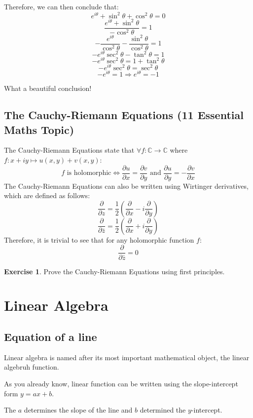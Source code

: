 \documentclass[a4paper]{article}
\theoremstyle{definition}
\newtheorem{exercise}{Exercise}[section]
\newcommand{\sectionSpace}{\vspace{2em}} %
\begin{document}
    Therefore, we can then conclude that:
    $$e^{i\theta} + \sin^2\theta + \cos^2\theta = 0$$
    $$\frac{e^{i\theta} + \sin^2\theta}{-\cos^2\theta} = 1$$
    $$-\frac{e^{i\theta}}{\cos^2\theta} -\frac{\sin^2\theta}{\cos^2\theta} = 1$$
    $$-e^{i\theta}\sec^2\theta -\tan^2\theta = 1$$
    $$-e^{i\theta}\sec^2\theta = 1 + \tan^2\theta$$
    $$-e^{i\theta}\sec^2\theta = \sec^2\theta$$
    $$-e^{i\theta} = 1 \Rightarrow e^{i\theta} = -1$$

    What a beautiful conclusion!

    \subsection{The Cauchy-Riemann Equations (11 Essential Maths Topic)}
    The Cauchy-Riemann Equations state that $\forall f:\mathbb{C}\to\mathbb{C}$ where $f:x+iy\mapsto u(x,y)+v(x,y)$:
    $$f \text{ is holomorphic}\Leftrightarrow \frac {\partial u}{\partial x}=\frac {\partial v}{\partial y} \text { and }\frac {\partial u}{\partial y}=-{\frac {\partial v}{\partial x}}$$
    The Cauchy-Riemann Equations can also be written using Wirtinger derivatives, which are defined as follows:
    $$\frac {\partial }{\partial z}={\frac {1}{2}}\left({\frac {\partial }{\partial x}}-i{\frac {\partial }{\partial y}}\right)$$
    $${\frac {\partial }{\partial {\bar {z}}}}={\frac {1}{2}}\left({\frac {\partial }{\partial x}}+i{\frac {\partial }{\partial y}}\right)$$
    Therefore, it is trivial to see that for any holomorphic function $f$:
    $${\frac {\partial }{\partial {\bar {z}}}}=0$$
    \begin{exercise}
        Prove the Cauchy-Riemann Equations using first principles.
    \end{exercise}

\sectionSpace
\section{Linear Algebra}
    \subsection{Equation of a line}
    Linear algebra is named after its most important mathematical object, the linear algebruh function.

    As you already know, linear function can be written using the slope-intercept form $y=ax+b$.

    The $a$ determines the slope of the line and $b$ determined the $y$-intercept.
\end{document}
